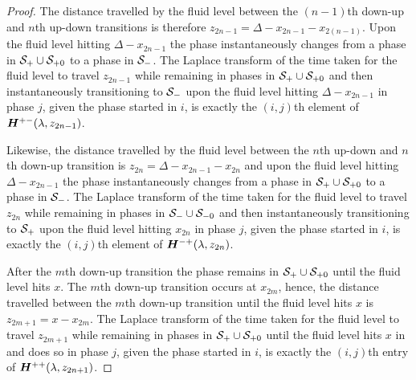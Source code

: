 \begin{proof}
The distance travelled by the fluid level between the \((n-1)\)th down-up and \(n\)th up-down transitions is therefore \(z_{2n-1}=\Delta-x_{2n-1}-{x_{2(n-1)}}\). Upon the fluid level hitting \(\Delta-x_{2n-1}\) the phase instantaneously changes from a phase in \(\mathcal{S}_+\cup\mathcal{S}_{+0}\) to a phase in \(\mathcal{S}_-\). The Laplace transform of the time taken for the fluid level to travel \(z_{2n-1}\) while remaining in phases in \(\mathcal{S}_{+}\cup\mathcal{S}_{+0}\) and then instantaneously transitioning to \(\mathcal{S}_-\) upon the fluid level hitting \(\Delta-x_{2n-1}\) in phase \(j\), given the phase started in \(i\), is exactly the \((i,j)\)th element of \(\boldsymbol H^{+-}(\lambda,z_{2n-1})\). 

Likewise, the distance travelled by the fluid level between the \(n\)th up-down and \(n\)th down-up transition is \(z_{2n}=\Delta-x_{2n-1}-x_{2n}\) and upon the fluid level hitting \(\Delta-x_{2n-1}\) the phase instantaneously changes from a phase in \(\mathcal{S}_+\cup\mathcal{S}_{+0}\) to a phase in \(\mathcal{S}_-\). The Laplace transform of the time taken for the fluid level to travel \(z_{2n}\) while remaining in phases in \(\mathcal{S}_{-}\cup\mathcal{S}_{-0}\) and then instantaneously transitioning to \(\mathcal{S}_+\) upon the fluid level hitting \(x_{2n}\) in phase \(j\), given the phase started in \(i\), is exactly the \((i,j)\)th element of \(\boldsymbol H^{-+}(\lambda,z_{2n})\). 

After the \(m\)th down-up transition the phase remains in \(\mathcal{S}_+\cup\mathcal{S}_{+0}\) until the fluid level hits \(x\). The \(m\)th down-up transition occurs at \(x_{2m}\), hence, the distance travelled between the \(m\)th down-up transition until the fluid level hits \(x\) is \(z_{2m+1}=x-x_{2m}\). The Laplace transform of the time taken for the fluid level to travel \(z_{2m+1}\) while remaining in phases in \(\mathcal{S}_{+}\cup\mathcal{S}_{+0}\) until the fluid level hits \(x\) in and does so in phase \(j\), given the phase started in \(i\), is exactly the \((i,j)\)th entry of \(\boldsymbol H^{++}(\lambda,z_{2n+1})\).


\end{proof}

